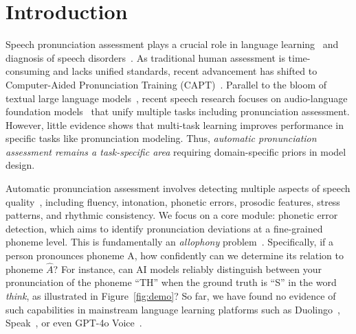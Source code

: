 \section{Introduction}

Speech pronunciation assessment plays a crucial role in language learning~\cite{kheir-etal-2023-automatic, truong04_icall} and diagnosis of speech disorders~\cite{ssdm}. As traditional human assessment is time-consuming and lacks unified standards, recent advancement has shifted to Computer-Aided Pronunciation Training (CAPT)~\cite{lee2016language-capt}.
Parallel to the bloom of textual large language models~\cite{OpenAI_chatgpt}, recent speech research focuses on audio-language foundation models~\cite{ji2024wavchat, huang2024dynamic} that unify multiple tasks including pronunciation assessment. However, little evidence shows that multi-task learning improves performance in specific tasks like pronunciation modeling. Thus, \textit{automatic pronunciation assessment remains a task-specific area} requiring domain-specific priors in model design.

Automatic pronunciation assessment involves detecting multiple aspects of speech quality~\cite{lee2016language-capt}, including fluency, intonation, phonetic errors, prosodic features, stress patterns, and rhythmic consistency. We focus on a core module: phonetic error detection, which aims to identify pronunciation deviations at a fine-grained phoneme level. This is fundamentally an \textit{allophony} problem~\cite{boomershine2008impact-allophony}. Specifically, if a person pronounces phoneme A, how confidently can we determine its relation to phoneme $\hat{A}$? For instance, can AI models reliably distinguish between your pronunciation of the phoneme ``TH'' when the ground truth is ``S'' in the word \textit{think}, as illustrated in Figure~\ref{fig:demo}? So far, we have found no evidence of such capabilities in mainstream language learning platforms such as Duolingo~\cite{Duolingo}, Speak~\cite{SpeakApp}, or even GPT-4o Voice~\cite{OpenAI_GPT4o}. 

